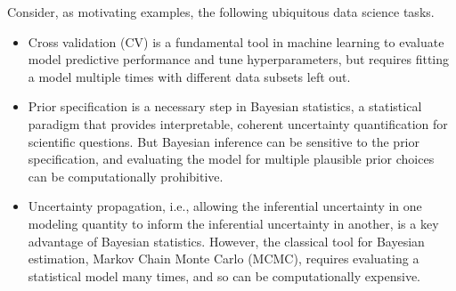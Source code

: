 Consider, as motivating examples, the following ubiquitous data science tasks.
%
\begin{itemize}
%
        \item Cross validation (CV) is a fundamental tool in machine learning to
        evaluate model predictive performance and tune hyperparameters, but
        requires fitting a model multiple times with different data subsets left
        out.
        \item  Prior specification is a necessary step in Bayesian statistics, a
        statistical paradigm that provides interpretable, coherent uncertainty
        quantification for scientific questions.  But Bayesian inference can be
        sensitive to the prior specification, and evaluating the model for
        multiple plausible prior choices can be computationally prohibitive.
        \item Uncertainty propagation, i.e., allowing the inferential
        uncertainty in one modeling quantity to inform the inferential
        uncertainty in another, is a key advantage of Bayesian statistics.
        However, the classical tool for Bayesian estimation, Markov Chain Monte
        Carlo (MCMC), requires evaluating a statistical model many times, and so
        can be computationally expensive.
%
\end{itemize}
%


